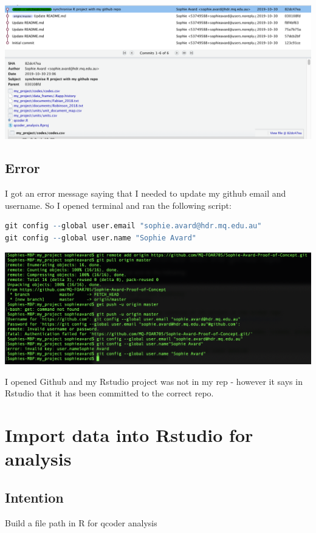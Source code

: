 \documentclass{article}
\begin{document}
\includegraphics[width=\textwidth]{review-git-commits.png}

\subsection{Error}
I got an error message saying that I needed to update my github email and username. So I opened terminal and ran the following script:
\begin{lstlisting}[language=R]
git config --global user.email "sophie.avard@hdr.mq.edu.au"
git config --global user.name "Sophie Avard"
\end{lstlisting}
\includegraphics[width=\textwidth]{sync-poc-with-github.png}

I opened Github and my Rstudio project was not in my rep - however it says in Rstudio that it has been committed to the correct repo. 

\section{Import data into Rstudio for analysis}
\subsection{Intention}
Build a file path in R for qcoder analysis 
\end{document}
